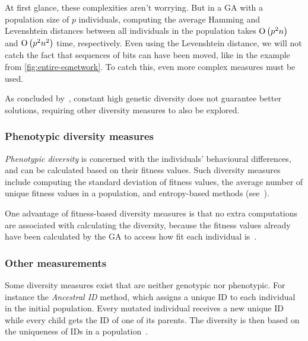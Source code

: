 At first glance, these complexities aren't worrying. But in a GA with a population size of $p$ individuals, computing the average Hamming and Levenshtein distances between all individuals in the population takes $\operatorname{O}\left(p^2 n\right)$ and $\operatorname{O}\left(p^2 n^2\right)$ time, respectively.
Even using the Levenshtein distance, we will not catch the fact that sequences of bits can have been moved, like in the example from \cref{fig:entire-eqnetwork}. To catch this, even more complex measures must be used.

As concluded by~\cite{Darwen00doesextra}, constant high genetic diversity does not guarantee better solutions, requiring other diversity measures to also be explored.

\subsubsection{Phenotypic diversity measures}
\emph{Phenotypic diversity} is concerned with the individuals' behavioural differences, and can be calculated based on their fitness values. Such diversity measures include computing the standard deviation of fitness values, the average number of unique fitness values in a population, and entropy-based methods (see~\cite{1250187, 1266373}).

One advantage of fitness-based diversity measures is that no extra computations are associated with calculating the diversity, because the fitness values already have been calculated by the GA to access how fit each individual is~\cite{Nguyen:2006:ASPGP}.

\subsubsection{Other measurements}
Some diversity measures exist that are neither genotypic nor phenotypic. For instance the \emph{Ancestral ID} method, which assigns a unique ID to each individual in the initial population. Every mutated individual receives a new unique ID while every child gets the ID of one of its parents. The diversity is then based on the uniqueness of IDs in a population~\cite{1250187}.


